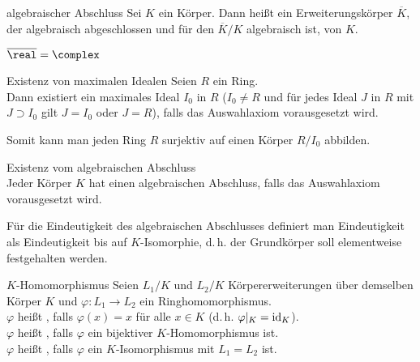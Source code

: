 \begin{Def}{algebraischer Abschluss}
    Sei $K$ ein Körper.
    Dann heißt ein Erweiterungskörper $\overline{K}$, der
    algebraisch abgeschlossen und für den $\overline{K}/K$
    algebraisch ist,
     von $K$.
\end{Def}

\begin{Bsp}
    $\overline{\real} = \complex$
\end{Bsp}

\linie

\begin{Theorem}{Existenz von maximalen Idealen}
    Seien $R$ ein Ring.\\
    Dann existiert ein maximales Ideal $I_0$ in $R$
    ($I_0 \not= R$ und für jedes Ideal $J$ in $R$ mit $J \supset I_0$
    gilt $J = I_0$ oder $J = R$),
    falls das Auswahlaxiom vorausgesetzt wird.
\end{Theorem}

\begin{Bem}
    Somit kann man jeden Ring $R$ surjektiv auf einen Körper $R/I_0$ abbilden.
\end{Bem}

\begin{Theorem}{Existenz vom algebraischen Abschluss}\\
    Jeder Körper $K$ hat einen algebraischen Abschluss,
    falls das Auswahlaxiom vorausgesetzt wird.
\end{Theorem}

\linie

\begin{Bem}
    Für die Eindeutigkeit des algebraischen Abschlusses definiert man
    Eindeutigkeit als Eindeutigkeit bis auf $K$-Isomorphie, d.\,h. der
    Grundkörper soll elementweise festgehalten werden.
\end{Bem}

\begin{Def}{$K$-Homomorphismus}
    Seien $L_1/K$ und $L_2/K$ Körpererweiterungen über demselben Körper $K$ und
    $\varphi\colon L_1 \rightarrow L_2$ ein Ringhomomorphismus.\\
    $\varphi$ heißt , falls $\varphi(x) = x$ für
    alle $x \in K$ (d.\,h. $\varphi|_K = \operatorname{id}_K$).\\
    $\varphi$ heißt , falls
    $\varphi$ ein bijektiver $K$-Homomorphismus ist.\\
    $\varphi$ heißt , falls
    $\varphi$ ein $K$-Isomorphismus mit $L_1 = L_2$ ist.
\end{Def}

